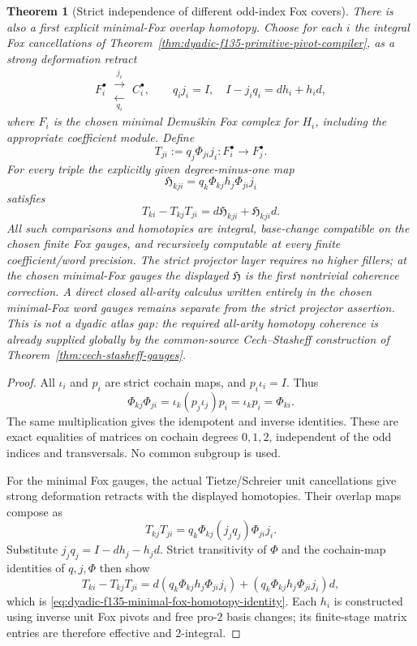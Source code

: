 \documentclass[11pt]{article}
\newtheorem{theorem}{Theorem}[section]
\theoremstyle{definition}
\begin{document}
\begin{theorem}[Strict independence of different odd-index Fox covers]
There is also a
first explicit
\emph{minimal-Fox
overlap homotopy}.
Choose for each
$i$ the integral
Fox cancellations of
Theorem~\ref{thm:dyadic-f135-primitive-pivot-compiler},
as a strong
deformation
retract
\[
F_i^\bullet
\ \substack{\xrightarrow{\ j_i\ }\\[-1ex]
\xleftarrow[\ q_i\ ]{}}\ 
C_i^\bullet,
\qquad
q_i j_i=I,\quad
I-j_iq_i=d h_i+h_i d,
\]
where $F_i$ is the
chosen minimal
Demu\v{s}kin
Fox complex
for $H_i$,
including the
appropriate
coefficient module.
Define
\begin{equation}\label{eq:dyadic-f135-minimal-fox-overlap-maps}
T_{ji}:=q_j\Phi_{ji}j_i:
F_i^\bullet\longrightarrow F_j^\bullet.
\end{equation}
For every triple
the explicitly
given degree-minus-one
map
\begin{equation}\label{eq:dyadic-f135-first-fox-overlap-homotopy}
\boxed{\quad
\mathfrak H_{kji}
=q_k\Phi_{kj}h_j\Phi_{ji}j_i
\quad}
\end{equation}
satisfies
\begin{equation}\label{eq:dyadic-f135-minimal-fox-homotopy-identity}
\boxed{\quad
T_{ki}-T_{kj}T_{ji}
=d\mathfrak H_{kji}
+\mathfrak H_{kji}d.
\quad}
\end{equation}
All such
comparisons and
homotopies are
integral,
base-change
compatible on
the chosen
finite Fox gauges,
and recursively
computable at
every finite
coefficient/word
precision.
The strict
projector layer
requires \emph{no}
higher fillers;
at the chosen
minimal-Fox
gauges the
displayed $\mathfrak H$
is the first
nontrivial
coherence correction.
A direct closed
all-arity calculus written entirely in the
chosen minimal-Fox word gauges remains
separate from the strict projector assertion.
This is not a dyadic atlas gap: the required
all-arity homotopy coherence is already supplied
globally by the common-source
Cech--Stasheff construction of
Theorem~\ref{thm:cech-stasheff-gauges}.
\end{theorem}

\begin{proof}
All $\iota_i$
and $p_i$
are strict
cochain maps,
and $p_i\iota_i=I$.
Thus
\[
\Phi_{kj}\Phi_{ji}
=\iota_k(p_j\iota_j)p_i
=\iota_kp_i=\Phi_{ki}.
\]
The same
multiplication
gives the
idempotent and
inverse
identities.
These are
exact equalities
of matrices
on cochain
degrees $0,1,2$,
independent of
the odd indices
and transversals.
No common
subgroup is used.

For the minimal
Fox gauges,
the actual
Tietze/Schreier
unit cancellations
give strong
deformation
retracts with
the displayed
homotopies.
Their overlap
maps compose as
\[
T_{kj}T_{ji}
=q_k\Phi_{kj}
(j_jq_j)\Phi_{ji}j_i.
\]
Substitute
$j_jq_j=I-dh_j-h_jd$.
Strict
transitivity of
$\Phi$ and
the cochain-map
identities of
$q,j,\Phi$
then show
\[
T_{ki}-T_{kj}T_{ji}
=d(q_k\Phi_{kj}h_j\Phi_{ji}j_i)
+(q_k\Phi_{kj}h_j\Phi_{ji}j_i)d,
\]
which is
\eqref{eq:dyadic-f135-minimal-fox-homotopy-identity}.
Each $h_i$
is constructed
using inverse
unit Fox pivots
and free
pro-$2$ basis
changes;
its finite-stage
matrix entries
are therefore
effective and
$2$-integral.
\end{proof}
\end{document}
